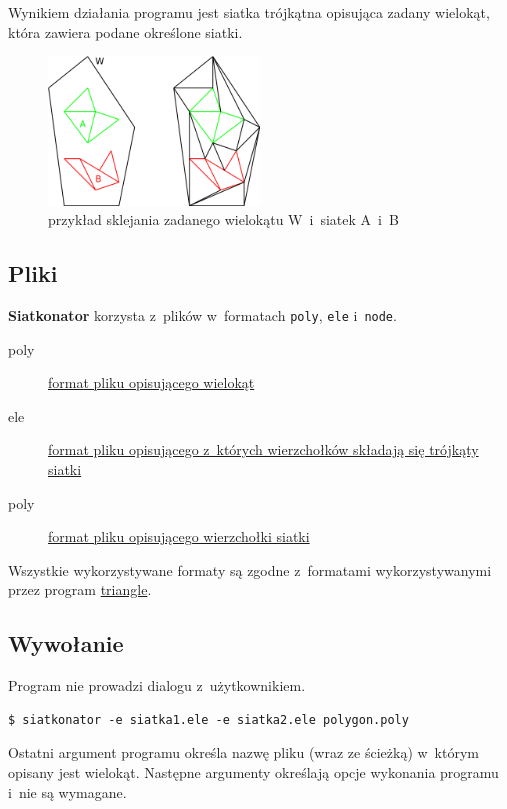 \documentclass[a4paper]{article}
\newcommand{\siatkonator}{\textbf{Siatkonator} }
\renewcommand{\triangle}{\href{http://www.cs.cmu.edu/~quake/triangle.html}{triangle}}
\begin{document}
Wynikiem działania programu jest siatka trójkątna opisująca zadany wielokąt, która zawiera podane określone siatki.

\begin{figure}[h]
  \centering
  \includegraphics[width=0.5\textwidth]{ilustracja.png}
  \caption{przykład sklejania zadanego wielokątu W~i~siatek A~i~B}
\end{figure}

\subsection{Pliki}
\siatkonator korzysta z~plików w~formatach \texttt{poly}, \texttt{ele} i~\texttt{node}.

\begin{description}
  \item[poly] \href{http://www.cs.cmu.edu/~quake/triangle.poly.html}{format pliku opisującego wielokąt}
  \item[ele] \href{http://www.cs.cmu.edu/~quake/triangle.ele.html}{format pliku opisującego z~których wierzchołków składają się trójkąty siatki}
  \item[poly] \href{http://www.cs.cmu.edu/~quake/triangle.poly.html}{format pliku opisującego wierzchołki siatki}
\end{description}

Wszystkie wykorzystywane formaty są zgodne z~formatami wykorzystywanymi przez program \triangle.

\subsection{Wywołanie}
Program nie prowadzi dialogu z~użytkownikiem.

\begin{lstlisting}[caption=Przykładowe wywołanie]
  $ siatkonator -e siatka1.ele -e siatka2.ele polygon.poly
\end{lstlisting}

Ostatni argument programu określa nazwę pliku (wraz ze ścieżką) w~którym opisany jest wielokąt.
Następne argumenty określają opcje wykonania programu i~nie są wymagane.
\end{document}

